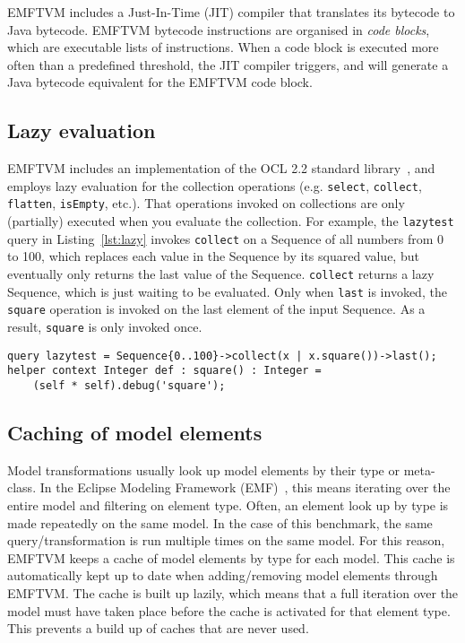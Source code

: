 \documentclass[submission,copyright,creativecommons]{eptcs}
\begin{document}
EMFTVM includes a Just-In-Time (JIT) compiler that translates its bytecode to Java bytecode. EMFTVM bytecode instructions are organised in \emph{code blocks}, which are executable lists of instructions. When a code block is executed more often than a predefined threshold, the JIT compiler triggers, and will generate a Java bytecode equivalent for the EMFTVM code block.

\subsection{Lazy evaluation}

EMFTVM includes an implementation of the OCL 2.2 standard library~\cite{omg/ocl22}, and employs lazy evaluation for the collection operations (e.g. \texttt{select}, \texttt{collect}, \texttt{flatten}, \texttt{isEmpty}, etc.). That operations invoked on collections are only (partially) executed when you evaluate the collection. For example, the \texttt{lazytest} query in Listing~\ref{lst:lazy} invokes \texttt{collect} on a Sequence of all numbers from 0 to 100, which replaces each value in the Sequence by its squared value, but eventually only returns the last value of the Sequence. \texttt{collect} returns a lazy Sequence, which is just waiting to be evaluated. Only when \texttt{last} is invoked, the \texttt{square} operation is invoked on the last element of the input Sequence. As a result, \texttt{square} is only invoked once.

\lstset{language=atl}
\begin{lstlisting}[float=htb, caption={Lazy collections in ATL}, label=lst:lazy, captionpos=b, frame=tb, belowskip=-10pt]
query lazytest = Sequence{0..100}->collect(x | x.square())->last();
helper context Integer def : square() : Integer =
	(self * self).debug('square');
\end{lstlisting}

\subsection{Caching of model elements}

Model transformations usually look up model elements by their type or meta-class. In the Eclipse Modeling Framework (EMF)~\cite{book/Budinsky03}, this means iterating over the entire model and filtering on element type. Often, an element look up by type is made repeatedly on the same model. In the case of this benchmark, the same query/transformation is run multiple times on the same model. For this reason, EMFTVM keeps a cache of model elements by type for each model. This cache is automatically kept up to date when adding/removing model elements through EMFTVM. The cache is built up lazily, which means that a full iteration over the model must have taken place before the cache is activated for that element type. This prevents a build up of caches that are never used.
\end{document}
